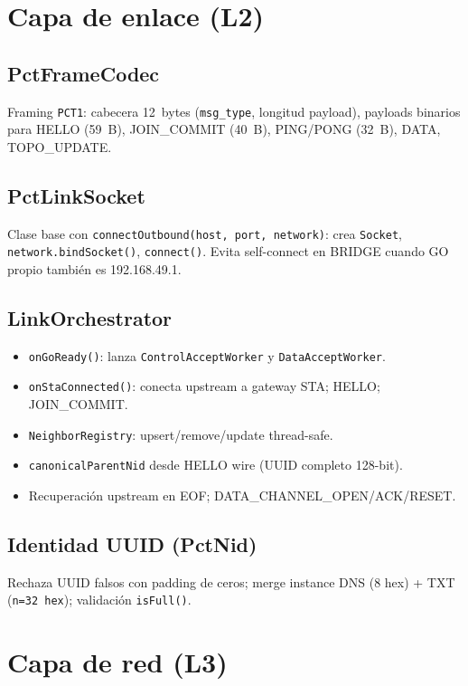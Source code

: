 \section{Capa de enlace (L2)}
\label{sec:impl-l2}

\subsection{PctFrameCodec}

Framing \texttt{PCT1}: cabecera 12~bytes (\texttt{msg\_type}, longitud payload), payloads binarios para HELLO (59~B), JOIN\_COMMIT (40~B), PING/PONG (32~B), DATA, TOPO\_UPDATE.

\subsection{PctLinkSocket}

Clase base con \texttt{connectOutbound(host, port, network)}: crea \texttt{Socket}, \texttt{network.bindSocket()}, \texttt{connect()}. Evita self-connect en BRIDGE cuando GO propio también es 192.168.49.1.

\subsection{LinkOrchestrator}

\begin{itemize}
  \item \texttt{onGoReady()}: lanza \texttt{ControlAcceptWorker} y \texttt{DataAcceptWorker}.
  \item \texttt{onStaConnected()}: conecta upstream a gateway STA; HELLO; JOIN\_COMMIT.
  \item \texttt{NeighborRegistry}: upsert/remove/update thread-safe.
  \item \texttt{canonicalParentNid} desde HELLO wire (UUID completo 128-bit).
  \item Recuperación upstream en EOF; DATA\_CHANNEL\_OPEN/ACK/RESET.
\end{itemize}

\subsection{Identidad UUID (PctNid)}

Rechaza UUID falsos con padding de ceros; merge instance DNS (8 hex) + TXT (\texttt{n=32 hex}); validación \texttt{isFull()}.

\section{Capa de red (L3)}
\label{sec:impl-l3}

